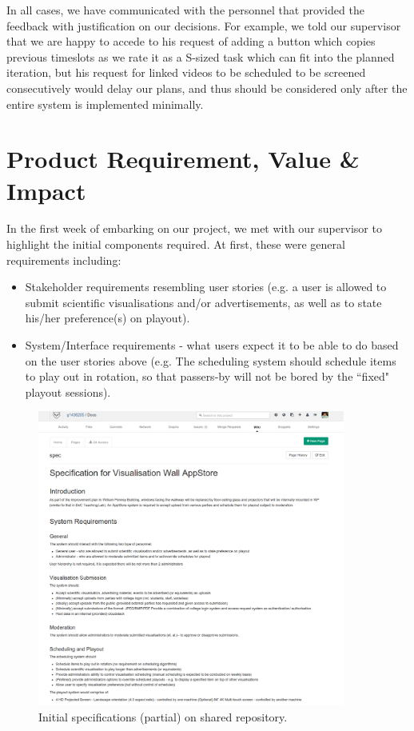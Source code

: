 \documentclass[a4paper]{article}
\begin{document}
In all cases, we have communicated with the personnel that provided the
feedback with justification on our decisions. For example, we told
our supervisor that we are happy to accede to his request of adding a button which copies previous timeslots as we rate it as a S-sized task which can fit into the planned iteration, but his request for linked videos to be scheduled to be screened consecutively would delay our plans, and thus should be considered only after the entire system is implemented minimally.

\section{Product Requirement, Value \& Impact}

In the first week of embarking on our project, we met with our supervisor to highlight the initial components required. At first, these were general
requirements including:

\begin{itemize}

  \item Stakeholder requirements resembling user stories (e.g. a user is allowed to submit scientific visualisations and/or advertisements, as well as to state his/her preference(s) on playout).

  \item System/Interface requirements - what users expect it to be able to do based on the user stories above (e.g. The scheduling system should schedule items to play out in rotation, so that passers-by will not be bored by the ``fixed" playout sessions).

\end{itemize}

\begin{figure}[H]
  \centering
    \includegraphics[width = 0.9\textwidth, trim = 0 15cm 0 5cm, clip]{./evaluation/specs.png}
  \caption{Initial specifications (partial) on shared repository.}
  \label{fig:specs}
\end{figure}
\end{document}
